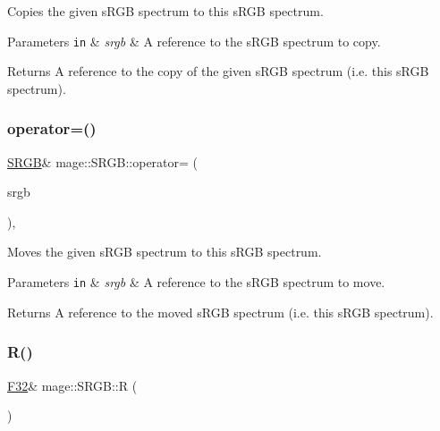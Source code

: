 Copies the given s\+R\+GB spectrum to this s\+R\+GB spectrum.


\begin{DoxyParams}[1]{Parameters}
\mbox{\tt in}  & {\em srgb} & A reference to the s\+R\+GB spectrum to copy. \\
\hline
\end{DoxyParams}
\begin{DoxyReturn}{Returns}
A reference to the copy of the given s\+R\+GB spectrum (i.\+e. this s\+R\+GB spectrum). 
\end{DoxyReturn}
\mbox{\label{structmage_1_1_s_r_g_b_a73ee0aadb04bbf07976b1e2daded2aff}} 
\subsubsection{\texorpdfstring{operator=()}{operator=()}\hspace{0.1cm}{\footnotesize\ttfamily [2/2]}}
{\footnotesize\ttfamily \mbox{\hyperlink{structmage_1_1_s_r_g_b}{S\+R\+GB}}\& mage\+::\+S\+R\+G\+B\+::operator= (\begin{DoxyParamCaption}\item[{\mbox{\hyperlink{structmage_1_1_s_r_g_b}{S\+R\+GB}} \&\&}]{srgb }\end{DoxyParamCaption})\hspace{0.3cm}{\ttfamily [default]}, {\ttfamily [noexcept]}}

Moves the given s\+R\+GB spectrum to this s\+R\+GB spectrum.


\begin{DoxyParams}[1]{Parameters}
\mbox{\tt in}  & {\em srgb} & A reference to the s\+R\+GB spectrum to move. \\
\hline
\end{DoxyParams}
\begin{DoxyReturn}{Returns}
A reference to the moved s\+R\+GB spectrum (i.\+e. this s\+R\+GB spectrum). 
\end{DoxyReturn}
\mbox{\label{structmage_1_1_s_r_g_b_a31af84b210d04e9313a8e4a9fc4670db}} 
\subsubsection{\texorpdfstring{R()}{R()}\hspace{0.1cm}{\footnotesize\ttfamily [1/2]}}
{\footnotesize\ttfamily \mbox{\hyperlink{namespacemage_aa97e833b45f06d60a0a9c4fc22ae02c0}{F32}}\& mage\+::\+S\+R\+G\+B\+::R (\begin{DoxyParamCaption}{ }\end{DoxyParamCaption})\hspace{0.3cm}{\ttfamily [noexcept]}}

